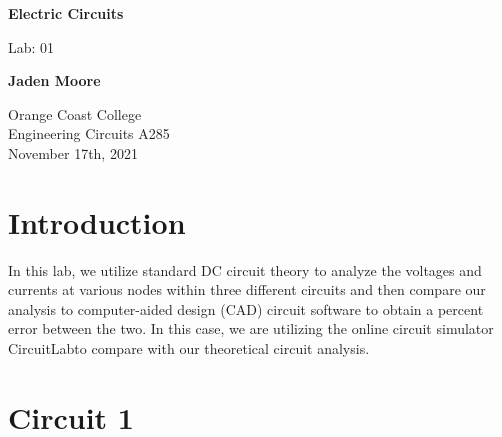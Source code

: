 \documentclass[12pt]{article}
\begin{document}

\begin{titlepage}
    \begin{center}
        \vspace*{1cm}
        \textbf{Electric Circuits}

        \vspace{0.5cm}
        Lab: 01

        \vspace{1cm}

        \textbf{Jaden Moore}

        \vfill

        Orange Coast College\\
        Engineering Circuits A285\\
        November 17th, 2021

    \end{center}
\end{titlepage}

\pagestyle{fancy}
\fancyhf{}
\setlength{\headheight}{15pt}
\cfoot{\thepage}

\section{Introduction}
In this lab, we utilize standard DC circuit theory to analyze the voltages and currents at various nodes within three different circuits and then compare our analysis to computer-aided design (CAD) circuit software to obtain a percent error between the two. In this case, we are utilizing the online circuit simulator CircuitLab\textregistered\space to compare with our theoretical circuit analysis.

\section{Circuit 1}
\end{document}

